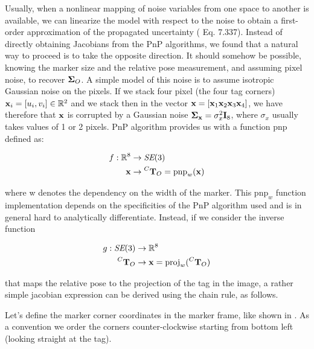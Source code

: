 Usually, when a nonlinear mapping of noise variables from one space to another is available, we can linearize the model with respect to the noise
to obtain a first-order approximation of the propagated uncertainty (\cite{barfoot2017state} Eq. 7.337).  
Instead of directly obtaining Jacobians from the PnP algorithms, we found that a natural way to proceed is to take the opposite 
direction. It should somehow be possible, knowing the marker size and the relative pose measurement, and assuming pixel noise, to
recover ${\bm \Sigma}_{O}$. A simple model of this noise is to assume isotropic Gaussian noise on the pixels. If we stack four pixel (the four tag corners) 
${\bf x}_i = [u_i, v_i] \in \mathbb{R}^2$ and we stack then in the vector ${\bf x} = [{\bf x}_1 {\bf x}_2 {\bf x}_3 {\bf x}_4]$, we have therefore that
${\bf x}$ is corrupted by a Gaussian noise ${\bm \Sigma}_{{\bf x}} = \sigma_{x}^2 {\bf I}_8$, where $\sigma_{x}$ usually takes values of 1 or 2 pixels.
PnP algorithm provides us with a function $\text{pnp}$ defined as:

\begin{equation}
    \begin{split}
        f: \mathbb{R}^8 &\rightarrow \textit{SE}(3) \\
                           {\bf x} &\rightarrow \prescript{C}{}{{\bf T}}_{O} = \text{pnp}_w({\bf x})
    \end{split}
\end{equation}

where w denotes the dependency on the width of the marker. This $\text{pnp}_w$ function implementation depends on the specificities of the PnP algorithm used and  
is in general hard to analytically differentiate. Instead, if we consider the inverse function

\begin{equation}
    \begin{split}
        g: \textit{SE}(3) &\rightarrow \mathbb{R}^8 \\
                           \prescript{C}{}{{\bf T}}_{O} &\rightarrow {\bf x} = \text{proj}_w(\prescript{C}{}{{\bf T}}_{O})
    \end{split}
\end{equation}

that maps the relative pose to the projection of the tag in the image, a rather simple jacobian expression can be derived using the chain rule, as follows.

Let's define the marker corner coordinates in the marker frame, like shown in . As a convention 
\cite{wang2016iros} we order the corners counter-clockwise starting from bottom left (looking straight at the tag). 

